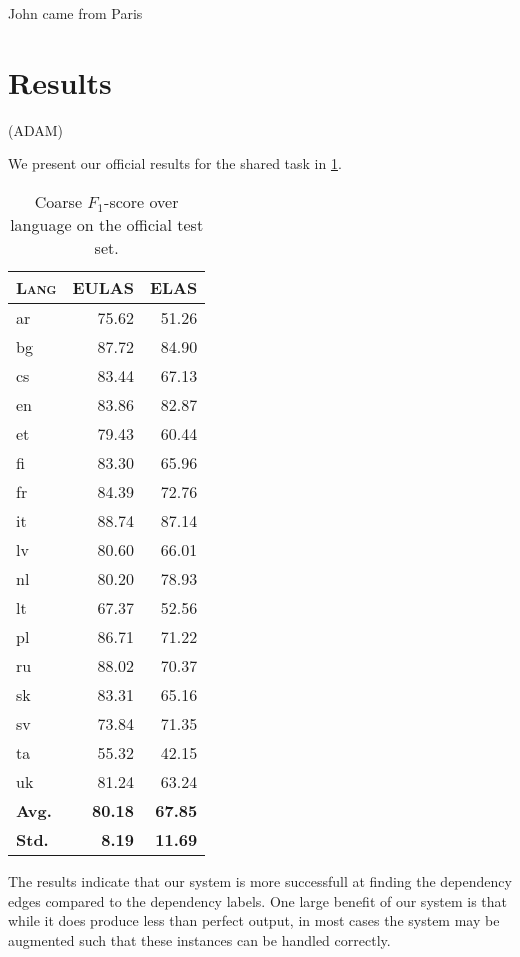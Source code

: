 \documentclass[11pt,a4paper]{article}
\begin{document}
John came from Paris


\section{Results}
(ADAM)

We present our official results for the shared task in \cref{tab:test}. 

\begin{table}[h]
	\centering
	\begin{tabular}{l|rr}
		\textsc{Lang} & \textsc{EULAS} & \textsc{ELAS} \\
		\hline
		ar & 75.62 & 51.26 \\
		bg & 87.72 & 84.90 \\
		cs & 83.44 & 67.13 \\
		en & 83.86 & 82.87 \\
		et & 79.43 & 60.44 \\
		fi & 83.30 & 65.96 \\
		fr & 84.39 & 72.76 \\
		it & 88.74 & 87.14 \\
		lv & 80.60 & 66.01 \\
		nl & 80.20 & 78.93 \\
		lt & 67.37 & 52.56 \\
		pl & 86.71 & 71.22 \\
		ru & 88.02 & 70.37 \\
		sk & 83.31 & 65.16 \\
		sv & 73.84 & 71.35 \\
		ta & 55.32 & 42.15 \\
		uk & 81.24 & 63.24 \\
		\textbf{Avg.} & \textbf{80.18} & \textbf{67.85} \\
        \textbf{Std.} & \textbf{8.19} & \textbf{11.69} \\
	\end{tabular}
\caption{\label{tab:test} Coarse $F_1$-score over language on the official test set.}
\end{table}

The results indicate that our system is more successfull at
finding the dependency edges compared to the dependency
labels. One large benefit of our system is that while it does
produce less than perfect output, in most cases the system may be
augmented such that these instances can be handled correctly.
\end{document}
